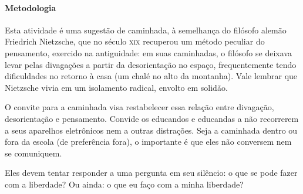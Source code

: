 \documentclass[12pt]{extarticle}
\begin{document}
\paragraph{Metodologia}

Esta atividade é uma sugestão de caminhada, à semelhança do filósofo
alemão Friedrich Nietzsche, que no século \textsc{xix} recuperou um método
peculiar do pensamento, exercido na antiguidade: em suas caminhadas, o
filósofo se deixava levar pelas divagações a partir da desorientação no
espaço, frequentemente tendo dificuldades no retorno à casa (um chalé no
alto da montanha). Vale lembrar que Nietzsche vivia em um isolamento
radical, envolto em solidão.

O convite para a caminhada visa restabelecer essa relação entre
divagação, desorientação e pensamento. Convide os educandos e educandas
a não recorrerem a seus aparelhos eletrônicos nem a outras distrações.
Seja a caminhada dentro ou fora da escola (de preferência fora), o
importante é que eles não conversem nem se comuniquem.

Eles devem tentar responder a uma pergunta em seu silêncio: o que se
pode fazer com a liberdade? Ou ainda: o que eu faço com a minha
liberdade?
\end{document}
